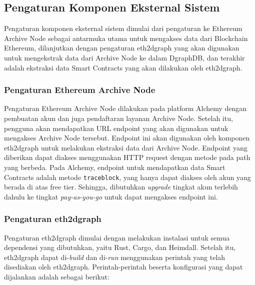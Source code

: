 \subsection{Pengaturan Komponen Eksternal Sistem}

Pengaturan komponen eksternal sistem dimulai dari pengaturan ke Ethereum Archive Node sebagai antarmuka utama untuk mengakses data dari Blockchain Ethereum, dilanjutkan dengan pengaturan eth2dgraph yang akan digunakan untuk mengekstrak data dari Archive Node ke dalam DgraphDB, dan terakhir adalah ekstraksi data Smart Contracts yang akan dilakukan oleh eth2dgraph.

\subsubsection{Pengaturan Ethereum Archive Node}

Pengaturan Ethereum Archive Node dilakukan pada platform Alchemy dengan pembuatan akun dan juga pendaftaran layanan Archive Node. Setelah itu, pengguna akan mendapatkan URL endpoint yang akan digunakan untuk mengakses Archive Node tersebut. Endpoint ini akan digunakan oleh komponen eth2dgraph untuk melakukan ekstraksi data dari Archive Node. Endpoint yang diberikan dapat diakses menggunakan HTTP request dengan metode pada path yang berbeda. Pada Alchemy, endpoint untuk mendapatkan data Smart Contracts adalah metode \texttt{trace\textunderscore block}, yang hanya dapat diakses oleh akun yang berada di atas free tier. Sehingga, dibutuhkan \textit{upgrade} tingkat akun terlebih dahulu ke tingkat \textit{pay-as-you-go} untuk dapat mengakses endpoint ini.

\subsubsection{Pengaturan eth2dgraph}

Pengaturan eth2dgraph dimulai dengan melakukan instalasi untuk semua dependensi yang dibutuhkan, yaitu Rust, Cargo, dan Heimdall. Setelah itu, eth2dgraph dapat di-\textit{build} dan di-\textit{run} menggunakan perintah yang telah disediakan oleh eth2dgraph. Perintah-perintah beserta konfigurasi yang dapat dijalankan adalah sebagai berikut:

